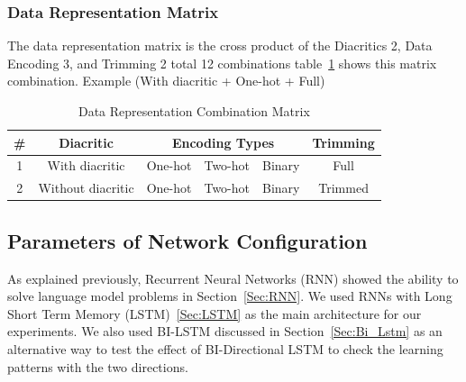 \subsubsection{Data Representation Matrix}

The data representation matrix is the cross product of the Diacritics 2, Data Encoding 3, and Trimming 2 total 12 combinations table~\ref{Tab:Data_Representation_Matrix} shows this matrix combination. Example (With diacritic + One-hot + Full)


\begin{table}[t]
  \centering
  \begin{tabular}{c c c c c c}
    \hline
    \textbf{\#} & \textbf{Diacritic} & \multicolumn{3}{c}{\textbf{Encoding Types}}  & \textbf{Trimming} \\
    
    \hline
    1 & With diacritic & One-hot & Two-hot & Binary & Full    \\
    \hline
    2 & Without diacritic & One-hot & Two-hot & Binary & Trimmed \\
    \hline
  \end{tabular}
  \caption{Data Representation Combination Matrix}\label{Tab:Data_Representation_Matrix}
\end{table}


%     
\subsection{Parameters of Network Configuration}\label{Sec:Rnn_Param}

As explained previously, Recurrent Neural Networks (RNN) showed the ability to solve language model problems in Section~\ref{Sec:RNN}. We used RNNs with Long Short Term Memory (LSTM)~\ref{Sec:LSTM} as the main architecture for our experiments. We also used BI-LSTM discussed in Section~\ref{Sec:Bi_Lstm} as an alternative way to test the effect of BI-Directional LSTM to check the learning patterns with the two directions.

